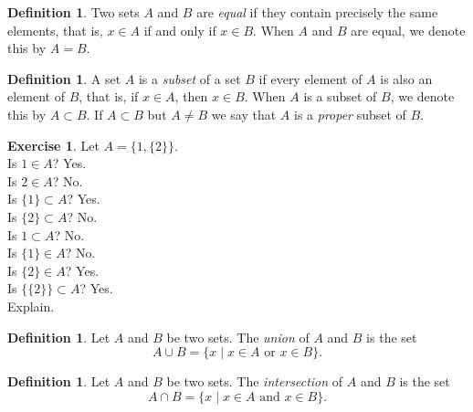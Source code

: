 \documentclass[11pt]{article}
\theoremstyle{definition}
\newtheorem{definition}[theorem]{Definition}
\newtheorem{exercise}[theorem]{Exercise}
\numberwithin{equation}{subsection}
\begin{document}
\begin{definition}  
Two sets $A$ and $B$ are {\em equal} if they contain precisely the same elements, that is, $x\in A$
if and only if $x\in B$.  When $A$ and $B$ are equal, we denote this by $A=B$.
\end{definition}

\begin{definition}  
A set $A$ is a {\em subset} of a set $B$ if every element of $A$ is also an element of $B$, that is,
if $x\in A$, then $x\in B$.  When $A$ is a subset of $B$, we denote this by $A\subset B$.  If $A\subset B$ but $A\neq B$ 
we say that $A$ is a {\em proper} subset of $B.$ 
\end{definition}


\begin{exercise}
Let $A=\{1, \{2\}\}$.  
\\ Is $1\in A$?  Yes.
\\Is $2\in A$?  No.
\\Is $\{1\}\subset A$?  Yes.
\\Is $\{2\}\subset A$?  No.
\\Is $1\subset A$?  No.
\\Is $\{1\}\in A$?  No.
\\Is $\{2\}\in A$?  Yes.
\\Is $\{\{2\}\}\subset A$? Yes.  
\\Explain.
\end{exercise}

\begin{definition}  Let $A$ and $B$ be two sets. 
The \emph{union} of $A$ and $B$ is the set
\[
A \cup B = \{x \mid \text{$x \in A$ or $x \in B$} \}.
\]
\end{definition}

\begin{definition}  Let $A$ and $B$ be two sets. 
The \emph{intersection} of $A$ and $B$ is the set
\[
A \cap B = \{ x \mid \text{$x \in A$ and $x \in B$} \}.
\]
\end{definition}
\end{document}
